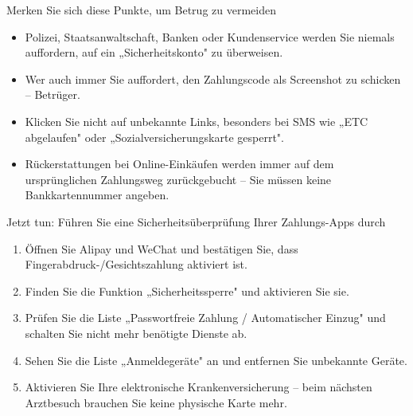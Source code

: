 \begin{tcbwarn}{Merken Sie sich diese Punkte, um Betrug zu vermeiden}
\begin{itemize}
  \item Polizei, Staatsanwaltschaft, Banken oder Kundenservice werden Sie niemals auffordern, auf ein „Sicherheitskonto" zu überweisen.
  \item Wer auch immer Sie auffordert, den Zahlungscode als Screenshot zu schicken – Betrüger.
  \item Klicken Sie nicht auf unbekannte Links, besonders bei SMS wie „ETC abgelaufen" oder „Sozialversicherungskarte gesperrt".
  \item Rückerstattungen bei Online-Einkäufen werden immer auf dem ursprünglichen Zahlungsweg zurückgebucht – Sie müssen keine Bankkartennummer angeben.
\end{itemize}

\end{tcbwarn}

\begin{tcbpractice}{Jetzt tun: Führen Sie eine Sicherheitsüberprüfung Ihrer Zahlungs-Apps durch}
\begin{enumerate}
  \item Öffnen Sie Alipay und WeChat und bestätigen Sie, dass Fingerabdruck-/Gesichtszahlung aktiviert ist.
  \item Finden Sie die Funktion „Sicherheitssperre" und aktivieren Sie sie.
  \item Prüfen Sie die Liste „Passwortfreie Zahlung / Automatischer Einzug" und schalten Sie nicht mehr benötigte Dienste ab.
  \item Sehen Sie die Liste „Anmeldegeräte" an und entfernen Sie unbekannte Geräte.
  \item Aktivieren Sie Ihre elektronische Krankenversicherung – beim nächsten Arztbesuch brauchen Sie keine physische Karte mehr.
\end{enumerate}

\end{tcbpractice}
